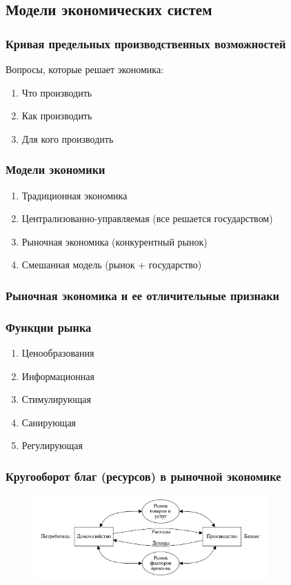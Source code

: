\subsection{Модели экономических систем}

\subsubsection{Кривая предельных производственных возможностей}

Вопросы, которые решает экономика:

\begin{enumerate}
    \item Что производить
    \item Как производить
    \item Для кого производить
\end{enumerate}

\subsubsection{Модели экономики}

\begin{enumerate}
    \item Традиционная экономика
    \item Централизованно-управляемая (все решается государством)
    \item Рыночная экономика (конкурентный рынок)
    \item Смешанная модель (рынок + государство)
\end{enumerate}

\subsubsection{Рыночная экономика и ее отличительные признаки}

\subsubsection{Функции рынка}

\begin{enumerate}
    \item Ценообразования
    \item Информационная
    \item Стимулирующая
    \item Санирующая
    \item Регулирующая
\end{enumerate}

\subsubsection{Кругооборот благ (ресурсов) в рыночной экономике}

\begin{figure}[H]
    \centering
    \includegraphics[width=0.8\textwidth]{img/content/module_1/circle.pdf}
    \label{fig:}
\end{figure}
